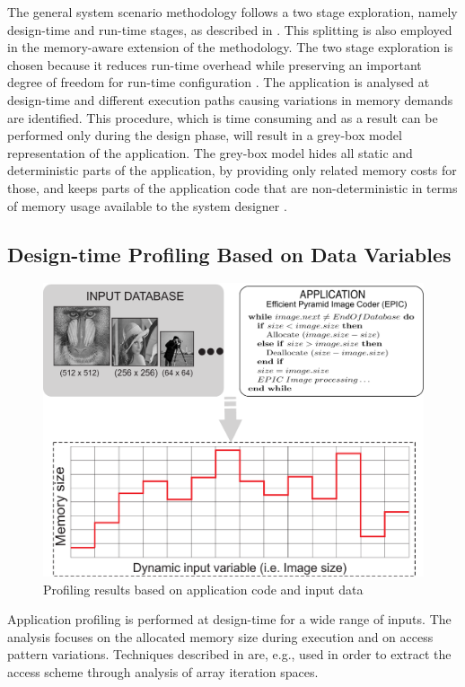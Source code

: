 The general system scenario methodology follows a two stage exploration, namely design-time and run-time stages, as described in \cite{Gheorghita2007}. This splitting is also employed in the memory-aware extension of the methodology. The two stage exploration is chosen because it reduces run-time overhead while preserving an important degree of freedom for run-time configuration \cite{tcm}. The application is analysed at design-time and different execution paths causing variations in memory demands are identified. This procedure, which is time consuming and as a result can be performed only during the design phase, will result in a grey-box model representation of the application. The grey-box model hides all static and deterministic parts of the application, by providing only related memory costs for those, and keeps parts of the application code that are non-deterministic in terms of memory usage available to the system designer \cite{graybox}. 


\subsection{Design-time Profiling Based on Data Variables}

\begin{figure}[!t]
\centering
\includegraphics[width=\textwidth]{B/Images/profiling2.pdf}
\caption{Profiling results based on application code and input data}
\label{fig:profiling}
\end{figure}

Application profiling is performed at design-time for a wide range of inputs. The analysis focuses on the allocated memory size during execution and on access pattern variations. Techniques described in \cite{Ang13b} are, e.g., used in order to extract the access scheme through analysis of array iteration spaces.  

